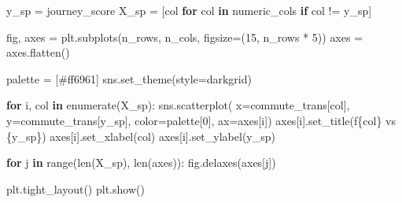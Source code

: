\documentclass[
  number]{elsarticle}
\newenvironment{Shaded}{\begin{snugshade}}{\end{snugshade}}
\newcommand{\BuiltInTok}[1]{\textcolor[rgb]{0.00,0.23,0.31}{#1}}
\newcommand{\ControlFlowTok}[1]{\textcolor[rgb]{0.00,0.23,0.31}{\textbf{#1}}}
\newcommand{\DecValTok}[1]{\textcolor[rgb]{0.68,0.00,0.00}{#1}}
\newcommand{\KeywordTok}[1]{\textcolor[rgb]{0.00,0.23,0.31}{\textbf{#1}}}
\newcommand{\NormalTok}[1]{\textcolor[rgb]{0.00,0.23,0.31}{#1}}
\newcommand{\OperatorTok}[1]{\textcolor[rgb]{0.37,0.37,0.37}{#1}}
\newcommand{\SpecialCharTok}[1]{\textcolor[rgb]{0.37,0.37,0.37}{#1}}
\newcommand{\SpecialStringTok}[1]{\textcolor[rgb]{0.13,0.47,0.30}{#1}}
\newcommand{\StringTok}[1]{\textcolor[rgb]{0.13,0.47,0.30}{#1}}
\begin{document}
\begin{Shaded}
\begin{Highlighting}[]
\NormalTok{y\_sp }\OperatorTok{=} \StringTok{\textquotesingle{}journey\_score\textquotesingle{}}
\NormalTok{X\_sp }\OperatorTok{=}\NormalTok{ [col }\ControlFlowTok{for}\NormalTok{ col }\KeywordTok{in}\NormalTok{ numeric\_cols }\ControlFlowTok{if}\NormalTok{ col }\OperatorTok{!=}\NormalTok{ y\_sp]}

\NormalTok{fig, axes }\OperatorTok{=}\NormalTok{ plt.subplots(n\_rows, n\_cols, figsize}\OperatorTok{=}\NormalTok{(}\DecValTok{15}\NormalTok{, n\_rows }\OperatorTok{*} \DecValTok{5}\NormalTok{))}
\NormalTok{axes }\OperatorTok{=}\NormalTok{ axes.flatten()}

\NormalTok{palette }\OperatorTok{=}\NormalTok{ [}\StringTok{\textquotesingle{}\#ff6961\textquotesingle{}}\NormalTok{]}
\NormalTok{sns.set\_theme(style}\OperatorTok{=}\StringTok{\textquotesingle{}darkgrid\textquotesingle{}}\NormalTok{)}

\ControlFlowTok{for}\NormalTok{ i, col }\KeywordTok{in} \BuiltInTok{enumerate}\NormalTok{(X\_sp):}
\NormalTok{    sns.scatterplot(}
\NormalTok{        x}\OperatorTok{=}\NormalTok{commute\_trans[col], y}\OperatorTok{=}\NormalTok{commute\_trans[y\_sp], color}\OperatorTok{=}\NormalTok{palette[}\DecValTok{0}\NormalTok{], ax}\OperatorTok{=}\NormalTok{axes[i])}
\NormalTok{    axes[i].set\_title(}\SpecialStringTok{f\textquotesingle{}}\SpecialCharTok{\{}\NormalTok{col}\SpecialCharTok{\}}\SpecialStringTok{ vs }\SpecialCharTok{\{}\NormalTok{y\_sp}\SpecialCharTok{\}}\SpecialStringTok{\textquotesingle{}}\NormalTok{)}
\NormalTok{    axes[i].set\_xlabel(col)}
\NormalTok{    axes[i].set\_ylabel(y\_sp)}

\ControlFlowTok{for}\NormalTok{ j }\KeywordTok{in} \BuiltInTok{range}\NormalTok{(}\BuiltInTok{len}\NormalTok{(X\_sp), }\BuiltInTok{len}\NormalTok{(axes)):}
\NormalTok{    fig.delaxes(axes[j])}

\NormalTok{plt.tight\_layout()}
\NormalTok{plt.show()}
\end{Highlighting}
\end{Shaded}
\end{document}
